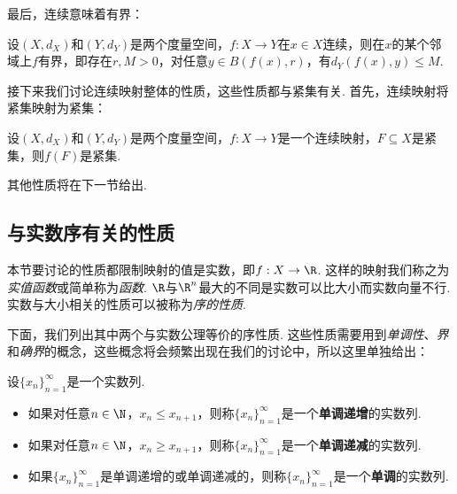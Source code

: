 最后，连续意味着有界：
\begin{proposition}\label{prop:continuous-bounded}
    设$(X,d_X)$和$(Y,d_Y)$是两个度量空间，$f:X\to Y$在$x\in X$连续，则在$x$的某个邻域上$f$有界，即存在$r,M>0$，对任意$y\in B(f(x),r)$，有$d_Y(f(x),y)\leq M$. 
\end{proposition}

接下来我们讨论连续映射整体的性质，这些性质都与紧集有关. 首先，连续映射将紧集映射为紧集：

\begin{proposition}\label{prop:continuous-compact}
    设$(X,d_X)$和$(Y,d_Y)$是两个度量空间，$f:X\to Y$是一个连续映射，$F\subseteq X$是紧集，则$f(F)$是紧集. 
\end{proposition}

其他性质将在下一节给出. 

\subsection{与实数序有关的性质}

本节要讨论的性质都限制映射的值是实数，即$f:X\to \R$. 这样的映射我们称之为\emph{实值函数}或简单称为\emph{函数}. $\R$与$\R^n$最大的不同是实数可以比大小而实数向量不行. 实数与大小相关的性质可以被称为\emph{序的性质}. 

下面，我们列出其中两个与实数公理等价的序性质. 这些性质需要用到\emph{单调性}、\emph{界}和\emph{确界}的概念，这些概念将会频繁出现在我们的讨论中，所以这里单独给出：

\begin{definition}[单调性]
    设$\{x_n\}_{n=1}^\infty$是一个实数列. 
\begin{itemize}
    \item 如果对任意$n\in\N$，$x_n\leq x_{n+1}$，则称$\{x_n\}_{n=1}^\infty$是一个\textbf{单调递增}的实数列. 
    \item 如果对任意$n\in\N$，$x_n\geq x_{n+1}$，则称$\{x_n\}_{n=1}^\infty$是一个\textbf{单调递减}的实数列. 
    \item 如果$\{x_n\}_{n=1}^\infty$是单调递增的或单调递减的，则称$\{x_n\}_{n=1}^\infty$是一个\textbf{单调}的实数列. 
\end{itemize}
\end{definition}

